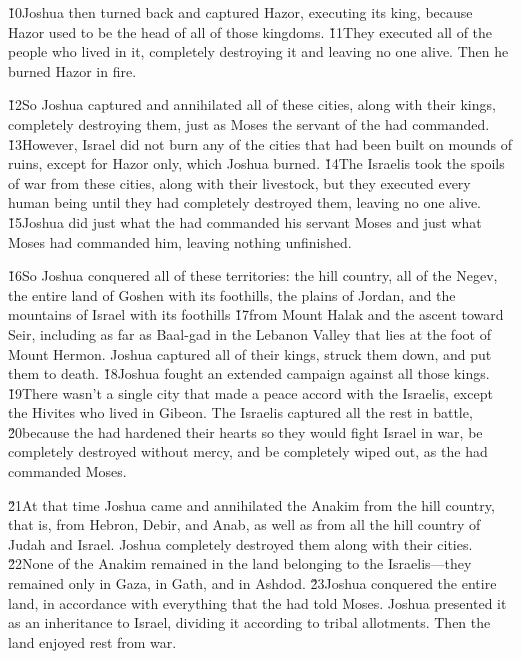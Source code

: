 \v{10}Joshua then turned back and captured Hazor, executing its king, because Hazor used to be the head of all of those kingdoms. \v{11}They executed all of the people who lived in it, completely destroying it and leaving no one alive. Then he burned Hazor in fire.

\v{12}So Joshua captured and annihilated all of these cities, along with their kings, completely destroying them, just as Moses the servant of the  had commanded. \v{13}However, Israel did not burn any of the cities that had been built on mounds of ruins, except for Hazor only, which Joshua burned. \v{14}The Israelis took the spoils of war from these cities, along with their livestock, but they executed every human being until they had completely destroyed them, leaving no one alive. \v{15}Joshua did just what the  had commanded his servant Moses and just what Moses had commanded him, leaving nothing unfinished.

\v{16}So Joshua conquered all of these territories: the hill country, all of the Negev, the entire land of Goshen with its foothills, the plains of Jordan, and the mountains of Israel with its foothills \v{17}from Mount Halak and the ascent toward Seir, including as far as Baal-gad in the Lebanon Valley that lies at the foot of Mount Hermon. Joshua captured all of their kings, struck them down, and put them to death. \v{18}Joshua fought an extended campaign against all those kings. \v{19}There wasn't a single city that made a peace accord with the Israelis, except the Hivites who lived in Gibeon. The Israelis captured all the rest in battle, \v{20}because the  had hardened their hearts so they would fight Israel in war, be completely destroyed without mercy, and be completely wiped out, as the  had commanded Moses.

\v{21}At that time Joshua came and annihilated the Anakim from the hill country, that is, from Hebron, Debir, and Anab, as well as from all the hill country of Judah and Israel. Joshua completely destroyed them along with their cities. \v{22}None of the Anakim remained in the land belonging to the Israelis---they remained only in Gaza, in Gath, and in Ashdod. \v{23}Joshua conquered the entire land, in accordance with everything that the  had told Moses. Joshua presented it as an inheritance to Israel, dividing it according to tribal allotments. Then the land enjoyed rest from war.

